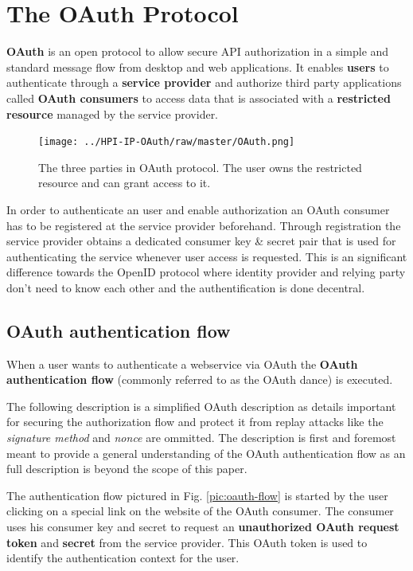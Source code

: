 \section{The OAuth Protocol}

\textbf{OAuth} is an open protocol to allow secure API
authorization in a simple and standard message flow from desktop and web
applications. \cite{oauth} \cite{rfc}
It enables \textbf{users} to
authenticate through a \textbf{service provider} and authorize third party applications called
\textbf{OAuth consumers} to access data that is associated with a
\textbf{restricted resource} managed by the
service provider.

\begin{figure}
	\centering
	\texttt{[image: ../HPI-IP-OAuth/raw/master/OAuth.png]}
	\caption{The three parties in OAuth protocol. The user owns the restricted resource and can grant access to it.}
\end{figure}

In order to authenticate an user and enable authorization an
OAuth consumer has to be registered at the service provider
beforehand. Through registration the service provider obtains a
dedicated consumer key \& secret pair that is used for
authenticating the service whenever user access is requested. This
is an significant difference towards the OpenID protocol where
identity provider and relying party don't need to know each other
and the authentification is done decentral. \cite{openid} 

\subsection{OAuth authentication flow}

When a user wants to authenticate a webservice via OAuth the
\textbf{OAuth authentication flow} (commonly referred to as the
OAuth dance) is executed.

The following description is a simplified OAuth description as
details important for securing the authorization flow and protect
it from replay attacks like the \emph{signature method} and
\emph{nonce} are ommitted. The description is first and foremost
meant to provide a general understanding of the OAuth
authentication flow as an full description is beyond the scope of
this paper.

The authentication flow pictured in Fig. \ref{pic:oauth-flow} is started
by the user clicking on a special link on the website of the OAuth consumer.
The consumer uses his consumer key and secret to request an
\textbf{unauthorized OAuth request token} and \textbf{secret} from
the service provider. This OAuth token is used to identify the
authentication context for the user.

